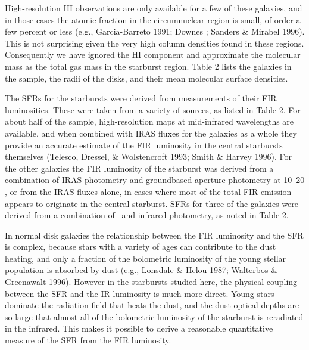 High-resolution HI observations are only available for a few of these 
galaxies, and in those cases the atomic fraction in the circumnuclear  
region is small, of order a few percent or less (e.g., 
Garcia-Barreto 1991; Downes ; Sanders \& Mirabel 1996).
This is not surprising given the very high column densities found in
these regions.  Consequently we have 
ignored the HI component and approximate the molecular mass as 
the total gas mass in the starburst region.  Table 2 lists the galaxies
in the sample, the radii of the disks, and their mean molecular 
surface densities.

The SFRs for the starbursts were derived from measurements of their
FIR luminosities.  These were taken from a variety of sources, as listed 
in Table 2.  For about half of the sample, high-resolution maps at 
mid-infrared wavelengths are available, and when combined with IRAS 
fluxes for the galaxies as a whole they provide an accurate
estimate of the FIR luminosity in the central starbursts themselves
(Telesco, Dressel, \& Wolstencroft 1993; Smith \& Harvey 1996).  For 
the other galaxies the FIR luminosity of the starburst was
derived from a combination of IRAS photometry and groundbased aperture
photometry at 10--20 \microns, or from the IRAS fluxes alone, in cases where 
most of the total FIR emission
appears to originate in the central starburst.  SFRs for three of the
galaxies were derived from a combination of \brgamma\ and 
infrared photometry, as noted in Table 2.

In normal disk galaxies the relationship between the FIR luminosity and the 
SFR is complex, because stars with a variety of ages can contribute to the dust 
heating, and only a fraction of the bolometric luminosity of the young 
stellar population is absorbed by dust (e.g., Lonsdale \& Helou 1987; 
Walterbos \& Greenawalt 1996).  However in the starbursts studied here,
the physical coupling between the SFR and the IR luminosity is much more direct.
Young stars dominate the radiation field that heats the dust, and the 
dust optical depths are so large that 
almost all of the bolometric luminosity of the starburst is 
reradiated in the infrared.  This makes it possible to derive a reasonable
quantitative measure of the SFR from the FIR luminosity.  

